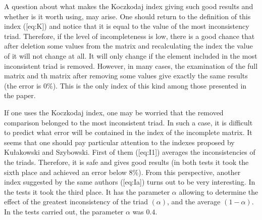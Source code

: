 A question about what makes the Koczkodaj index giving such good results and whether is it worth using, may arise. One should return to the definition of this index ([eq:K]) and notice that it is equal to the value of the most inconsistency triad. Therefore, if the level of incompleteness is low, there is a good chance that after deletion some values from the matrix and recalculating the index the value of it will not change at all. It will only change if the element included in the most inconsistent triad is removed. However, in many cases, the examination of the full matrix and th matrix after removing some values give exactly the same results (the error is $0\%$). This is the only index of this kind among those presented in the paper.

If one uses the Koczkodaj index, one may be worried that the removed comparison belonged to the most inconsistent triad. In such a case, it is difficult to predict what error will be contained in the index of the incomplete matrix. It seems that one should pay particular attention to the indexes proposed by Kułakowski and Szybowski. First of them ([eq:I1]) averages the inconsistencies of the triads. Therefore, it is safe and gives good results (in both tests it took the sixth place and achieved an error below $8\%$). From this perspective, another index suggested by the same authors ([eq:Ia]) turns out to be very interesting. In the tests it took the third place. It has the parameter $\alpha$ allowing to determine the effect of the greatest inconsistency of the triad $\left(\alpha\right)$, and the average $\left(1-\alpha\right)$. In the tests carried out, the parameter $\alpha$ was $0.4$.